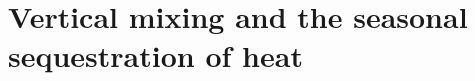 \documentclass{ametsocV5}
\begin{document}








\section{Vertical mixing and the seasonal sequestration of heat} %
\label{sec:subsurface_heat_sequestration}
\end{document}
